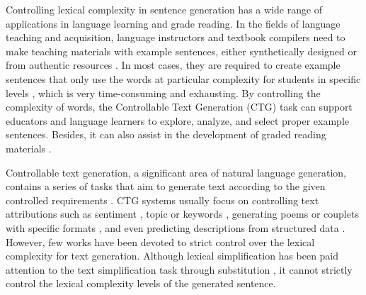 \documentclass[11pt]{article}
\begin{document}
Controlling lexical complexity in sentence generation has a wide range of applications in language learning and grade reading. In the fields of language teaching and acquisition, language instructors and textbook compilers need to make teaching materials with example sentences, either synthetically designed or from authentic resources \cite{caro2017lexis, lu2019sentence}. In most cases, they are required to create example sentences that only use the words at particular complexity for students in specific levels \cite{nordlund2020vocabulary, laufer2021lexical}, which is very time-consuming and exhausting. By controlling the complexity of words, the Controllable Text Generation (CTG) task can support educators and language learners to explore, analyze, and select proper example sentences. Besides, it can also assist in the development of graded reading materials \cite{ryu2020analysis, al2021efl, amer2021lexical}.

Controllable text generation, a significant area of natural language generation, contains a series of tasks that aim to generate text according to the given controlled requirements \cite{prabhumoye2020exploring,zhang2022survey}. CTG systems usually focus on controlling text attributions such as sentiment \cite{hu2017toward, zhang2019emotional, samanta2020fine}, topic \cite{dathathri2019plug, tang2019topic, khalifa2020distributional} or keywords \cite{he2021parallel, zhang2020pointer, mcmc-xlnet}, generating poems or couplets with specific formats \cite{chen2019sentiment, shao2021sentiment, sheng2021songmass}, and even predicting descriptions from structured data \cite{zhao2020bridging, su2021plan, ribeiro2021structural}. However, few works have been devoted to strict control over the lexical complexity for text generation. Although lexical simplification has been paid attention to the text simplification task through substitution \cite{kriz2018simplification}, it cannot strictly control the lexical complexity levels of the generated sentence.
\end{document}
